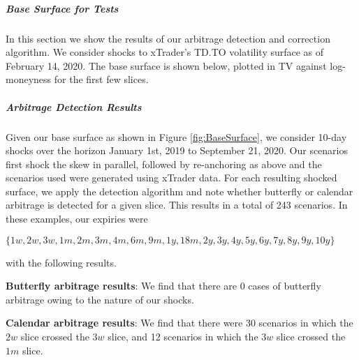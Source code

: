 \documentclass[11pt,letterpaper]{article}
\begin{document}
\subparagraph{Base Surface for Tests}

In this section we show the results of our arbitrage detection and correction algorithm. We consider shocks to xTrader's TD.TO volatility surface as of February 14, 2020. The base surface is shown below, plotted in TV against log-moneyness for the first few slices. 



\subparagraph{Arbitrage Detection Results}

Given our base surface as shown in Figure \ref{fig:BaseSurface}, we consider 10-day shocks over the horizon January 1st, 2019 to September 21, 2020. Our scenarios first shock the skew in parallel, followed by re-anchoring as above and the scenarios used were generated using xTrader data. For each resulting shocked surface, we apply the detection algorithm and note whether butterfly or calendar arbitrage is detected for a given slice. This results in a total of 243 scenarios. In these examples, our expiries were 
\begin{center}
$\{1w, 2w, 3w, 1m, 2m, 3m, 4m, 6m, 9m, 1y, 18m, 2y, 3y, 4y, 5y, 6y, 7y, 8y, 9y, 10y\}$
\end{center}
with the following results.

\begin{center}
\textbf{Butterfly arbitrage results}: We find that there are 0 cases of butterfly arbitrage owing to the nature of our shocks.
\end{center}

\begin{center}
\textbf{Calendar arbitrage results}: We find that there were 30 scenarios in which the $2w$ slice crossed the $3w$ slice, and 12 scenarios in which the $3w$ slice crossed the $1m$ slice. 
\end{center}
\end{document}
